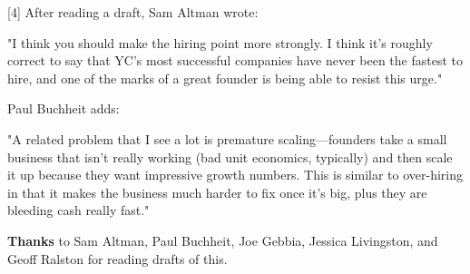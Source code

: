 [4] After reading a draft, Sam Altman wrote:

"I
                  think you should make the hiring point more strongly. I think
                  it's roughly correct to say that YC's most successful
                  companies have never been the fastest to hire, and one of the
                  marks of a great founder is being able to resist this
                  urge."

Paul Buchheit adds:

"A related
                  problem that I see a lot is premature scaling---founders
                  take a small business that isn't really working (bad unit
                  economics, typically) and then scale it up because they want
                  impressive growth numbers. This is similar to over-hiring in
                  that it makes the business much harder to fix once it's big,
                  plus they are bleeding cash really fast."


                  \textbf{Thanks} to Sam Altman, Paul Buchheit, Joe Gebbia,
                  Jessica Livingston, and Geoff Ralston for reading drafts of
                  this.


              
            
          
            
              
                


                  
              
            
          
